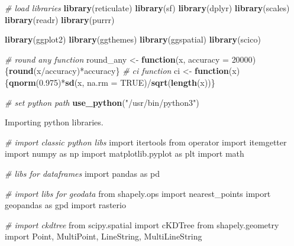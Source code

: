 \documentclass[]{article}
\newenvironment{Shaded}{}{}
\newcommand{\CommentTok}[1]{\textcolor[rgb]{0.38,0.63,0.69}{\textit{#1}}}
\newcommand{\ControlFlowTok}[1]{\textcolor[rgb]{0.00,0.44,0.13}{\textbf{#1}}}
\newcommand{\DataTypeTok}[1]{\textcolor[rgb]{0.56,0.13,0.00}{#1}}
\newcommand{\DecValTok}[1]{\textcolor[rgb]{0.25,0.63,0.44}{#1}}
\newcommand{\FloatTok}[1]{\textcolor[rgb]{0.25,0.63,0.44}{#1}}
\newcommand{\ImportTok}[1]{#1}
\newcommand{\KeywordTok}[1]{\textcolor[rgb]{0.00,0.44,0.13}{\textbf{#1}}}
\newcommand{\NormalTok}[1]{#1}
\newcommand{\OperatorTok}[1]{\textcolor[rgb]{0.40,0.40,0.40}{#1}}
\newcommand{\OtherTok}[1]{\textcolor[rgb]{0.00,0.44,0.13}{#1}}
\newcommand{\StringTok}[1]{\textcolor[rgb]{0.25,0.44,0.63}{#1}}
\begin{document}
\begin{Shaded}
\begin{Highlighting}[]
\CommentTok{# load libraries}
\KeywordTok{library}\NormalTok{(reticulate)}
\KeywordTok{library}\NormalTok{(sf)}
\KeywordTok{library}\NormalTok{(dplyr)}
\KeywordTok{library}\NormalTok{(scales)}
\KeywordTok{library}\NormalTok{(readr)}
\KeywordTok{library}\NormalTok{(purrr)}

\KeywordTok{library}\NormalTok{(ggplot2)}
\KeywordTok{library}\NormalTok{(ggthemes)}
\KeywordTok{library}\NormalTok{(ggspatial)}
\KeywordTok{library}\NormalTok{(scico)}

\CommentTok{# round any function}
\NormalTok{round_any <-}\StringTok{ }\ControlFlowTok{function}\NormalTok{(x, }\DataTypeTok{accuracy =} \DecValTok{20000}\NormalTok{)\{}\KeywordTok{round}\NormalTok{(x}\OperatorTok{/}\NormalTok{accuracy)}\OperatorTok{*}\NormalTok{accuracy\}}
\CommentTok{# ci function}
\NormalTok{ci <-}\StringTok{ }\ControlFlowTok{function}\NormalTok{(x)\{}\KeywordTok{qnorm}\NormalTok{(}\FloatTok{0.975}\NormalTok{)}\OperatorTok{*}\KeywordTok{sd}\NormalTok{(x, }\DataTypeTok{na.rm =} \OtherTok{TRUE}\NormalTok{)}\OperatorTok{/}\KeywordTok{sqrt}\NormalTok{(}\KeywordTok{length}\NormalTok{(x))\}}

\CommentTok{# set python path}
\KeywordTok{use_python}\NormalTok{(}\StringTok{"/usr/bin/python3"}\NormalTok{)}
\end{Highlighting}
\end{Shaded}

Importing python libraries.

\begin{Shaded}
\begin{Highlighting}[]
\CommentTok{# import classic python libs}
\ImportTok{import}\NormalTok{ itertools}
\ImportTok{from}\NormalTok{ operator }\ImportTok{import}\NormalTok{ itemgetter}
\ImportTok{import}\NormalTok{ numpy }\ImportTok{as}\NormalTok{ np}
\ImportTok{import}\NormalTok{ matplotlib.pyplot }\ImportTok{as}\NormalTok{ plt}
\ImportTok{import}\NormalTok{ math}

\CommentTok{# libs for dataframes}
\ImportTok{import}\NormalTok{ pandas }\ImportTok{as}\NormalTok{ pd}

\CommentTok{# import libs for geodata}
\ImportTok{from}\NormalTok{ shapely.ops }\ImportTok{import}\NormalTok{ nearest_points}
\ImportTok{import}\NormalTok{ geopandas }\ImportTok{as}\NormalTok{ gpd}
\ImportTok{import}\NormalTok{ rasterio}

\CommentTok{# import ckdtree}
\ImportTok{from}\NormalTok{ scipy.spatial }\ImportTok{import}\NormalTok{ cKDTree}
\ImportTok{from}\NormalTok{ shapely.geometry }\ImportTok{import}\NormalTok{ Point, MultiPoint, LineString, MultiLineString}
\end{Highlighting}
\end{Shaded}
\end{document}
